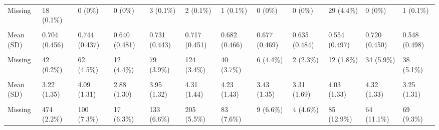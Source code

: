 \documentclass[
  single column]{article}
\begin{document}
\begin{landscape}
\begin{longtable}[t]{llllllllllll}
Missing & 18 (0.1\%) & 0 (0\%) & 0 (0\%) & 3 (0.1\%) & 2 (0.1\%) & 1 (0.1\%) & 0 (0\%) & 0 (0\%) & 29 (4.4\%) & 0 (0\%) & 1 (0.1\%)\\
\cellcolor{gray!10}{partner\_binary} & \cellcolor{gray!10}{} & \cellcolor{gray!10}{} & \cellcolor{gray!10}{} & \cellcolor{gray!10}{} & \cellcolor{gray!10}{} & \cellcolor{gray!10}{} & \cellcolor{gray!10}{} & \cellcolor{gray!10}{} & \cellcolor{gray!10}{} & \cellcolor{gray!10}{} & \cellcolor{gray!10}{}\\
Mean (SD) & 0.704 (0.456) & 0.744 (0.437) & 0.640 (0.481) & 0.731 (0.443) & 0.717 (0.451) & 0.682 (0.466) & 0.677 (0.469) & 0.635 (0.484) & 0.554 (0.497) & 0.720 (0.450) & 0.548 (0.498)\\
\addlinespace
\cellcolor{gray!10}{Median [Min, Max]} & \cellcolor{gray!10}{1.00 [0, 1.00]} & \cellcolor{gray!10}{1.00 [0, 1.00]} & \cellcolor{gray!10}{1.00 [0, 1.00]} & \cellcolor{gray!10}{1.00 [0, 1.00]} & \cellcolor{gray!10}{1.00 [0, 1.00]} & \cellcolor{gray!10}{1.00 [0, 1.00]} & \cellcolor{gray!10}{1.00 [0, 1.00]} & \cellcolor{gray!10}{1.00 [0, 1.00]} & \cellcolor{gray!10}{1.00 [0, 1.00]} & \cellcolor{gray!10}{1.00 [0, 1.00]} & \cellcolor{gray!10}{1.00 [0, 1.00]}\\
Missing & 42 (0.2\%) & 62 (4.5\%) & 12 (4.4\%) & 79 (3.9\%) & 124 (3.4\%) & 40 (3.7\%) & 6 (4.4\%) & 2 (2.3\%) & 12 (1.8\%) & 34 (5.9\%) & 38 (5.1\%)\\
\cellcolor{gray!10}{political\_conservative} & \cellcolor{gray!10}{} & \cellcolor{gray!10}{} & \cellcolor{gray!10}{} & \cellcolor{gray!10}{} & \cellcolor{gray!10}{} & \cellcolor{gray!10}{} & \cellcolor{gray!10}{} & \cellcolor{gray!10}{} & \cellcolor{gray!10}{} & \cellcolor{gray!10}{} & \cellcolor{gray!10}{}\\
Mean (SD) & 3.22 (1.35) & 4.09 (1.31) & 2.88 (1.30) & 3.95 (1.32) & 4.31 (1.44) & 4.23 (1.43) & 3.43 (1.35) & 3.31 (1.69) & 4.03 (1.33) & 4.32 (1.33) & 3.25 (1.31)\\
\cellcolor{gray!10}{Median [Min, Max]} & \cellcolor{gray!10}{3.00 [1.00, 7.00]} & \cellcolor{gray!10}{4.00 [1.00, 7.00]} & \cellcolor{gray!10}{3.00 [1.00, 7.00]} & \cellcolor{gray!10}{4.00 [1.00, 7.00]} & \cellcolor{gray!10}{4.00 [1.00, 7.00]} & \cellcolor{gray!10}{4.00 [1.00, 7.00]} & \cellcolor{gray!10}{3.00 [1.00, 7.00]} & \cellcolor{gray!10}{3.00 [1.00, 7.00]} & \cellcolor{gray!10}{4.00 [1.00, 7.00]} & \cellcolor{gray!10}{4.00 [1.00, 7.00]} & \cellcolor{gray!10}{3.00 [1.00, 7.00]}\\
\addlinespace
Missing & 474 (2.2\%) & 100 (7.3\%) & 17 (6.3\%) & 133 (6.6\%) & 205 (5.5\%) & 83 (7.6\%) & 9 (6.6\%) & 4 (4.6\%) & 85 (12.9\%) & 64 (11.1\%) & 69 (9.3\%)\\

\end{longtable}
\end{landscape}
\end{document}
